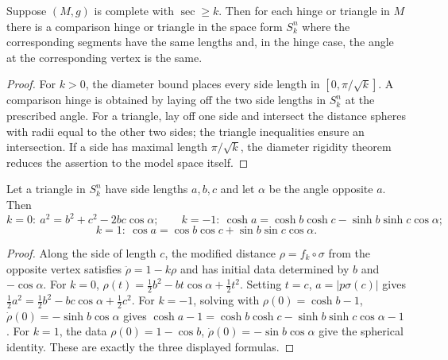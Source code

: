 \begin{lemma}
  \label{lem:pet-ch12-comparison-hinge-triangle-exist}
  Suppose $(M,g)$ is complete with $\sec\ge k$. Then for each hinge or triangle
  in $M$ there is a comparison hinge or triangle in the space form $S_k^n$ where
  the corresponding segments have the same lengths and, in the hinge case, the
  angle at the corresponding vertex is the same.
\end{lemma}
\begin{proof}
  \sketch
  For $k>0$, the diameter bound places every side length in
  $[0,\pi/\sqrt{k}]$. A comparison hinge is obtained by laying off the two side
  lengths in $S_k^n$ at the prescribed angle. For a triangle, lay off one side
  and intersect the distance spheres with radii equal to the other two sides;
  the triangle inequalities ensure an intersection. If a side has maximal
  length $\pi/\sqrt{k}$, the diameter rigidity theorem reduces the assertion to
  the model space itself.
\end{proof}

\begin{proposition}
  \label{prop:pet-ch12-law-of-cosines}
  Let a triangle in $S_k^n$ have side lengths $a,b,c$ and let $\alpha$ be the
  angle opposite $a$. Then
  \[
    k=0:\ a^2=b^2+c^2-2bc\cos\alpha;\qquad
    k=-1:\ \cosh a=\cosh b\cosh c-\sinh b\sinh c\cos\alpha;
  \]
  \[
    k=1:\ \cos a=\cos b\cos c+\sin b\sin c\cos\alpha.
  \]
\end{proposition}
\begin{proof}
  \sketch
  Along the side of length $c$, the modified distance $\rho=f_k\circ\sigma$
  from the opposite vertex satisfies $\ddot\rho=1-k\rho$ and has initial data
  determined by $b$ and $-\cos\alpha$. For $k=0$,
  $\rho(t)=\tfrac12b^2-b t\cos\alpha+\tfrac12t^2$. Setting $t=c$, $a=|p\sigma(c)|$
  gives $\tfrac12a^2=\tfrac12b^2-bc\cos\alpha+\tfrac12c^2$.
  For $k=-1$, solving with
  $\rho(0)=\cosh b-1$, $\dot\rho(0)=-\sinh b\cos\alpha$ gives
  $\cosh a-1=\cosh b\cosh c-\sinh b\sinh c\cos\alpha-1$.
  For $k=1$, the data
  $\rho(0)=1-\cos b$, $\dot\rho(0)=-\sin b\cos\alpha$ give the spherical
  identity. These are exactly the three displayed formulas.
\end{proof}

